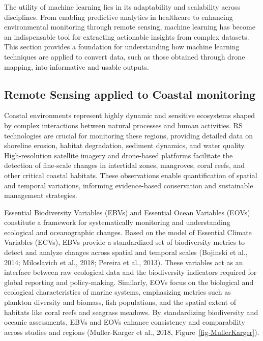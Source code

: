 \documentclass[
  letterpaper,
  11pt,
  english,
  singlespacing,
  headsepline]{MastersDoctoralThesis}
\begin{document}
\begin{spacing}{1.5}
The utility of machine learning lies in its adaptability and scalability
across disciplines. From enabling predictive analytics in healthcare to
enhancing environmental monitoring through remote sensing, machine
learning has become an indispensable tool for extracting actionable
insights from complex datasets. This section provides a foundation for
understanding how machine learning techniques are applied to convert
data, such as those obtained through drone mapping, into informative and
usable outputs.

\subsection{Remote Sensing applied to Coastal
monitoring}\label{remote-sensing-applied-to-coastal-monitoring}

Coastal environments represent highly dynamic and sensitive ecosystems
shaped by complex interactions between natural processes and human
activities. RS technologies are crucial for monitoring these regions,
providing detailed data on shoreline erosion, habitat degradation,
sediment dynamics, and water quality. High-resolution satellite imagery
and drone-based platforms facilitate the detection of fine-scale changes
in intertidal zones, mangroves, coral reefs, and other critical coastal
habitats. These observations enable quantification of spatial and
temporal variations, informing evidence-based conservation and
sustainable management strategies.

Essential Biodiversity Variables (EBVs) and Essential Ocean Variables
(EOVs) constitute a framework for systematically monitoring and
understanding ecological and oceanographic changes. Based on the model
of Essential Climate Variables (ECVs), EBVs provide a standardized set
of biodiversity metrics to detect and analyze changes across spatial and
temporal scales (Bojinski et al., 2014; Miloslavich et al., 2018;
Pereira et al., 2013). These variables act as an interface between raw
ecological data and the biodiversity indicators required for global
reporting and policy-making. Similarly, EOVs focus on the biological and
ecological characteristics of marine systems, emphasizing metrics such
as plankton diversity and biomass, fish populations, and the spatial
extent of habitats like coral reefs and seagrass meadows. By
standardizing biodiversity and oceanic assessments, EBVs and EOVs
enhance consistency and comparability across studies and regions
(Muller-Karger et al., 2018, Figure~\ref{fig-MullerKarger}).


\end{spacing}
\end{document}
